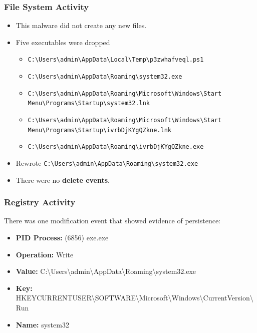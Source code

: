 \documentclass[10pt]{article}
\begin{document}
\subsubsection{File System Activity}
\begin{itemize}
	\item This malware did not create any new files.
	\item Five executables were dropped
	\begin{itemize}
		\item \texttt{\scriptsize{C:\textbackslash Users\textbackslash admin\textbackslash AppData\textbackslash Local\textbackslash Temp\textbackslash p3zwhafveql.ps1}}
		\item \texttt{\scriptsize{C:\textbackslash Users\textbackslash admin\textbackslash AppData\textbackslash Roaming\textbackslash system32.exe}}
		\item \texttt{\scriptsize{C:\textbackslash Users\textbackslash admin\textbackslash AppData\textbackslash Roaming\textbackslash Microsoft\textbackslash Windows\textbackslash Start Menu\textbackslash Programs\textbackslash Startup\textbackslash system32.lnk}}
		\item \texttt{\scriptsize{C:\textbackslash Users\textbackslash admin\textbackslash AppData\textbackslash Roaming\textbackslash Microsoft\textbackslash Windows\textbackslash Start Menu\textbackslash Programs\textbackslash Startup\textbackslash ivrbDjKYgQZkne.lnk}}
		\item \texttt{\scriptsize{C:\textbackslash Users\textbackslash admin\textbackslash AppData\textbackslash Roaming\textbackslash ivrbDjKYgQZkne.exe}}
	\end{itemize}
	\item Rewrote \texttt{C:\textbackslash Users\textbackslash admin\textbackslash AppData\textbackslash Roaming\textbackslash system32.exe}
	\item There were no \textbf{delete events}.
\end{itemize}
\subsubsection{Registry Activity}
There was one modification event that showed evidence of persistence:
\begin{itemize}
	\item \scriptsize{\textbf{{PID} Process:} (6856) exe.exe}
	\item \scriptsize{\textbf{Operation:} Write}
	\item \scriptsize{\textbf{Value:} C:\textbackslash Users\textbackslash admin\textbackslash AppData\textbackslash Roaming\textbackslash system32.exe}
	\item \scriptsize{\textbf{Key:} \small{HKEY\underbar{   }CURRENT\underbar{   }USER\textbackslash SOFTWARE\textbackslash Microsoft\textbackslash Windows\textbackslash CurrentVersion\textbackslash Run}}
	\item \scriptsize{\textbf{Name:} system32}
\end{itemize}
\end{document}
